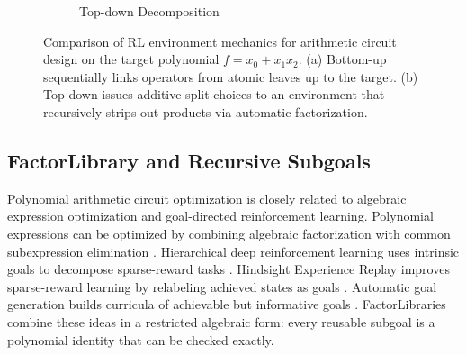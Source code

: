 \documentclass{article}
\theoremstyle{definition}
\theoremstyle{remark}
\begin{document}
\begin{figure}[t]
\begin{subfigure}[b]{0.54\textwidth}
        \caption{Top-down Decomposition}
        \label{fig:top-down}
    \end{subfigure}
    
    \caption{Comparison of RL environment mechanics for arithmetic circuit design on the target polynomial $f = x_0 + x_1x_2$. (a) Bottom-up sequentially links operators from atomic leaves up to the target. (b) Top-down issues additive split choices to an environment that recursively strips out products via automatic factorization.}
    \label{fig:framework_comparison}
\end{figure}

\subsection{FactorLibrary and Recursive Subgoals}

\label{subsec:factor-library}

Polynomial arithmetic circuit optimization is closely related to algebraic expression optimization and goal-directed reinforcement learning. Polynomial expressions can be optimized by combining algebraic factorization with common subexpression elimination \citep{Hosangadi2006OptimizingPolynomials}. Hierarchical deep reinforcement learning uses intrinsic goals to decompose sparse-reward tasks \citep{Kulkarni2016HierarchicalDeepRL}. Hindsight Experience Replay improves sparse-reward learning by relabeling achieved states as goals \citep{Andrychowicz2017HER}. Automatic goal generation builds curricula of achievable but informative goals \citep{Florensa2018AutomaticGoalGeneration}. FactorLibraries combine these ideas in a restricted algebraic form: every reusable subgoal is a polynomial identity that can be checked exactly.
\end{document}

